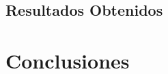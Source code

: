 \documentclass{endm}
\begin{document}
\subsection{Resultados Obtenidos}








\clearpage

%
\section{Conclusiones}\label{Conclusiones}

\clearpage

%





%

\end{document}
